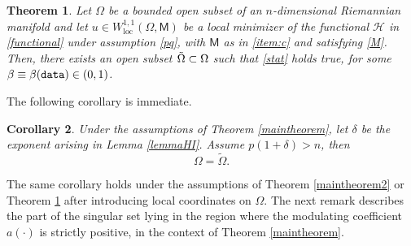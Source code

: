 \documentclass[a4paper]{amsart}
\def\loc{\operatorname{loc}}
\newtheorem{theorem}{Theorem}[section]
\newtheorem{corollary}[theorem]{Corollary}
\theoremstyle{plain}  %
\numberwithin{equation}{section}
\newcommand{\mm}{\mathsf{M}}
\newcommand{\tx}[1]{\textnormal{\texttt{#1}}}
\def\loc{\operatorname{loc}}
\begin{document}
\begin{theorem} \label{maintheorem3}
Let $\Omega$ be a bounded open subset of an $n$-dimensional Riemannian manifold and let $u \in W^{1,1}_{\loc}(\Omega, {\mm})$ be a local minimizer of the functional $\mathcal{H}$ in \eqref{functional} under assumption \eqref{pq}, with $\mm$ as in \ref{item:c} and satisfying \eqref{M}. Then, there exists an open subset $\Tilde{\Omega} \subset \Omega$ such that
\eqref{stat} holds true,
     for some $\beta \equiv \beta(\tx{data}) \in (0,1)$. 
\end{theorem} 
\noindent
The following corollary is immediate.
\begin{corollary}
Under the assumptions of Theorem \ref{maintheorem},  let $\delta$ be the exponent arising in Lemma \eqref{lemmaHI}. Assume $p(1+\delta) > n$, then
      $$ \Omega = \tilde{\Omega}.$$
\end{corollary}
\noindent
The same corollary holds under the assumptions of Theorem \ref{maintheorem2} or Theorem \ref{maintheorem3} after introducing local coordinates on $\Omega$. The next remark describes the part of the singular set lying in the region where the modulating coefficient $a(\cdot)$ is strictly positive, in the context of Theorem \ref{maintheorem}.
\end{document}
